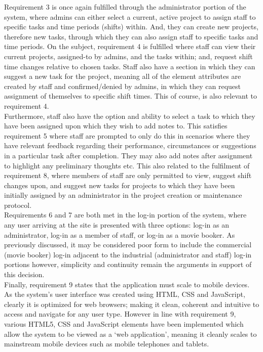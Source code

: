 \documentclass[11pt, english]{article}
\begin{document}
	Requirement 3 is once again fulfilled through the administrator portion of the system, where admins can either select a current, active project to assign staff to specific tasks and time periods (shifts) within. And, they can create new projects, therefore new tasks, through which they can also assign staff to specific tasks and time periods. On the subject, requirement 4 is fulfilled where staff can view their current projects, assigned-to by admins, and the tasks within; and, request shift time changes relative to chosen tasks. Staff also have a section in which they can suggest a new task for the project, meaning all of the element attributes are created by staff and confirmed/denied by admins, in which they can request assignment of themselves to specific shift times. This of course, is also relevant to requirement 4.\\

	Furthermore, staff also have the option and ability to select a task to which they have been assigned upon which they wish to add notes to. This satisfies requirement 5 where staff are prompted to only do this in scenarios where they have relevant feedback regarding their performance, circumstances or suggestions in a particular task after completion. They may also add notes after assignment to highlight any preliminary thoughts etc. This also related to the fulfilment of requirement 8, where members of staff are only permitted to view, suggest shift changes upon, and suggest new tasks for projects to which they have been initially assigned by an administrator in the project creation or maintenance protocol.\\

	Requirements 6 and 7 are both met in the log-in portion of the system, where any user arriving at the site is presented with three options: log-in as an administrator, log-in as a member of staff, or log-in as a movie booker. As previously discussed, it may be considered poor form to include the commercial (movie booker) log-in adjacent to the industrial (administrator and staff) log-in portions however, simplicity and continuity remain the arguments in support of this decision.\\

	Finally, requirement 9 states that the application must scale to mobile devices. As the system's user interface was created using HTML, CSS and JavaScript, clearly it is optimized for web browsers; making it clean, coherent and intuitive to access and navigate for any user type. However in line with requirement 9, various HTML5, CSS and JavaScript elements have been implemented which allow the system to be viewed as a `web application', meaning it cleanly scales to mainstream mobile devices such as mobile telephones and tablets.\\
\end{document}
